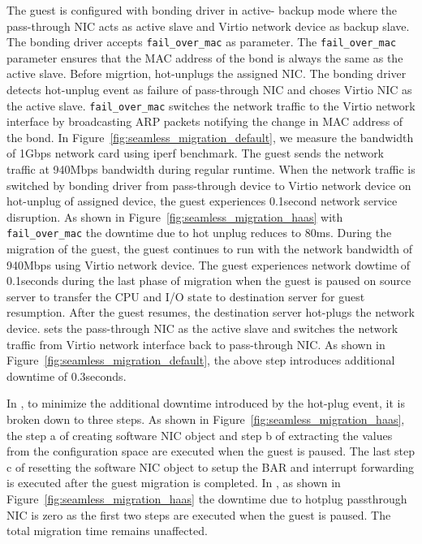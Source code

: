 The guest is configured with bonding driver in active-
backup mode where the pass-through NIC acts as 
active slave and Virtio network device as 
backup slave. The bonding driver accepts 
\texttt{fail\_over\_mac} as parameter. The 
\texttt{fail\_over\_mac} parameter ensures that the
MAC address of the bond is always the same as the active
slave. Before migrtion, \na hot-unplugs the assigned
NIC. The bonding driver detects hot-unplug event as failure
of pass-through NIC and choses
Virtio NIC as the active slave. \texttt{fail\_over\_mac} 
switches the network 
traffic to the Virtio network interface by broadcasting
ARP packets notifying the change in MAC address of the bond.
In Figure~\ref{fig:seamless_migration_default}, we measure 
the bandwidth of 1Gbps network card using iperf benchmark. 
The guest sends the network traffic at 940Mbps bandwidth 
during regular runtime. When the network traffic is 
switched by bonding driver from pass-through device to 
Virtio network device on hot-unplug of assigned device, 
the guest experiences 0.1second network service disruption.
As shown in Figure~\ref{fig:seamless_migration_haas} with
\texttt{fail\_over\_mac} the downtime due to hot unplug reduces 
to 80ms.
During the migration of the guest, the guest continues
to run with the network bandwidth of 940Mbps using Virtio network
device. The guest experiences network dowtime of 
0.1seconds during the last phase of migration 
when the guest is paused on source server
to transfer the CPU and I/O state to destination server 
for guest resumption. After the guest resumes, the
destination server hot-plugs the network device. \na
sets the pass-through NIC as the active slave and
switches the network traffic from Virtio network interface
back to pass-through NIC. As shown in 
Figure~\ref{fig:seamless_migration_default}, the above step
introduces additional downtime of 0.3seconds.

In \na, to minimize the additional downtime introduced by
the hot-plug event, it is broken down to three steps.
As shown in Figure~\ref{fig:seamless_migration_haas}, 
the step a of creating software NIC object 
and step b of extracting the values from the 
configuration space are executed when the guest 
is paused. The last step c of resetting the 
software NIC object to setup the BAR and 
interrupt forwarding is executed after 
the guest migration is completed. In \na, as
shown in Figure~\ref{fig:seamless_migration_haas} the 
downtime due to hotplug passthrough NIC is zero
as the first two steps are executed when the guest is
paused. The total migration time remains unaffected.

